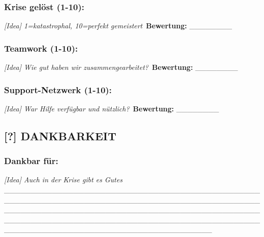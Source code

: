 \hypertarget{krise-geluxf6st-1-10}{%
\subsubsection{\texorpdfstring{\textbf{Krise gelöst (1-10):}}{Krise gelöst (1-10):}}\label{krise-geluxf6st-1-10}}

\emph{[Idea] 1=katastrophal, 10=perfekt gemeistert}\
\textbf{Bewertung:} \_\_\_\_\_\_\_\_

\hypertarget{teamwork-1-10}{%
\subsubsection{\texorpdfstring{\textbf{Teamwork (1-10):}}{Teamwork (1-10):}}\label{teamwork-1-10}}

\emph{[Idea] Wie gut haben wir zusammengearbeitet?}\
\textbf{Bewertung:} \_\_\_\_\_\_\_\_

\hypertarget{support-netzwerk-1-10}{%
\subsubsection{\texorpdfstring{\textbf{Support-Netzwerk (1-10):}}{Support-Netzwerk (1-10):}}\label{support-netzwerk-1-10}}

\emph{[Idea] War Hilfe verfügbar und nützlich?}\
\textbf{Bewertung:} \_\_\_\_\_\_\_\_

\hypertarget{dankbarkeit}{%
\subsection{\texorpdfstring{\textbf{[?] DANKBARKEIT}}{[?] DANKBARKEIT}}\label{dankbarkeit}}

\hypertarget{dankbar-fuxfcr}{%
\subsubsection{\texorpdfstring{\textbf{Dankbar für:}}{Dankbar für:}}\label{dankbar-fuxfcr}}

\emph{[Idea] Auch in der Krise gibt es Gutes} \_\_\_\_\_\_\_\_\_\_\_\_\_\_\_\_\_\_\_\_\_\_\_\_\_\_\_\_\_\_\_\_\_\_\_\_\_\_\_\_\_\_\_\_\_\_\_\_\_\_\_\_\_\_\_\_\_\_\_\_\_\_\_\_\_\_\_\_\_\_\_\_\_\_\_\_\_\_\_\_\_\_\_\_\_\_\_\_\_\_\_\_\_\_\_\_\_\_\_\_\_\_\_\_\_\_\_\_\_\_\_\_\_\_\_\_\_\_\_\_\_\_\_\_\_\_\_\_\_\_\_\_\_\_\_\_\_\_\_\_\_\_\_\_\_\_\_\_\_\_\_\_\_\_\_\_\_\_\_\_\_\_\_\_\_\_\_\_\_\_\_\_\_\_\_\_\_\_\_\_\_\_\_\_\_\_\_\_\_\_\_\_\_\_\_\_\_\_\_\_\_\_\_\_\_\_\_\_\_\_\_\_\_\_\_\_\_\_\_\_\_\_\_\_\_\_\_\_\_\_\_

